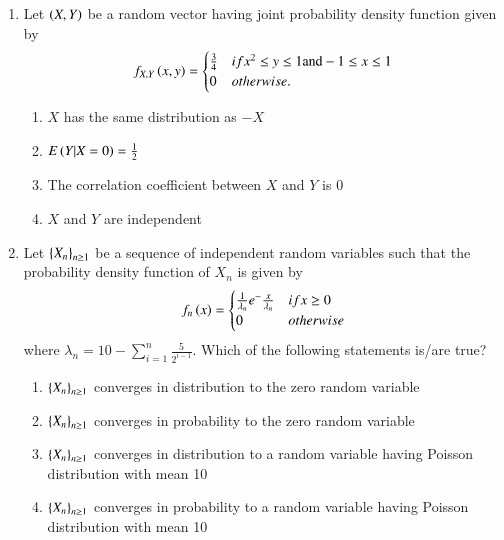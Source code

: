 \documentclass[journal,12pt,onecolumn]{IEEEtran}
\theoremstyle{remark}
\begin{document}
\begin{enumerate}
\item Let $\left(X, Y\right)$ be a random vector having joint probability density function given by 
\begin{align}
f_{X, Y}\left(x, y\right) = \begin{cases} \frac{3}{4} & if x^{2} \leq y \leq 1 \text{and} -1 \leq x \leq 1 \\ 0 & otherwise.
\end{cases}
\end{align}
\begin{enumerate}
\item $X$ has the same distribution as $-X$
\item $E\left(Y | X =0\right) = \frac{1}{2}$
\item The correlation coefficient between $X$ and $Y$ is 0
\item $X$ and $Y$ are independent
\end{enumerate}


\item Let $\left\{X_{n}\right\}_{n \geq 1}$ be a sequence of independent random variables such that the probability density function of ${X}_{n}$ is given by 
\begin{align}
f_{n}\left(x\right) = \begin{cases} \frac{1}{\lambda_{n}}e^-\frac{x}{\lambda_{n}} & if x \geq 0 \\ 0 & otherwise
\end{cases} 
\end{align}
where $\lambda_{n} = 10 - \sum_{i = 1} ^{n} \frac{5}{2 ^{i-1}}.$ Which of the following statements is/are true?
\begin{enumerate}
\item $\left\{X_{n}\right\}_{ n \geq 1}$ converges in distribution to the zero random variable
\item $\left\{X_{n}\right\}_{ n \geq 1}$ converges in probability to the zero random variable
\item $\left\{X_{n}\right\}_{ n \geq 1}$ converges in distribution to a random variable having Poisson distribution with mean 10
\item $\left\{X_{n}\right\}_{ n \geq 1}$ converges in probability to a random variable having Poisson distribution with mean 10
\end{enumerate}




\end{enumerate}
\end{document}
